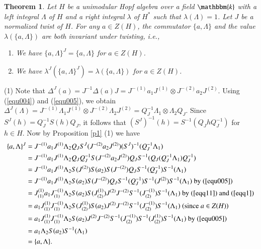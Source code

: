 \documentclass[11pt]{amsart}
\newtheorem{thm}{Theorem}[section]
\numberwithin{equation}{section}
\begin{document}
\begin{thm}\label{t1}
Let $H$ be a unimodular Hopf algebra over a field $\mathbbm{k}$ with a left integral $\Lambda$ of $H$ and a right integral $\lambda$ of $H^*$ such that $\lambda(\Lambda)=1$. Let $J$ be a normalized twist of $H$. For any $a\in Z(H)$, the commutator $\{a,\Lambda\}$ and the value $\lambda(\{a,\Lambda\})$ are both invariant under twisting, i.e.,
\begin{enumerate}
  \item We have $\{a,\Lambda\}^J=\{a,\Lambda\}$ for $a\in Z(H)$.  
  \item We have $\lambda^J(\{a,\Lambda\}^J)=\lambda(\{a,\Lambda\})$ for $a\in Z(H)$.  
\end{enumerate}
\end{thm}
\proof (1) Note that $\Delta^J(a)=J^{-1}\Delta(a)J=J^{-(1)}a_1J^{(1)}\otimes J^{-(2)}a_2J^{(2)}$. Using (\ref{equ004}) and (\ref{equ005}), we obtain  $\Delta^J(\Lambda)=J^{-(1)}\Lambda_1J^{(1)}\otimes J^{-(2)}\Lambda_2J^{(2)}=Q_J^{-1}\Lambda_1\otimes\Lambda_2Q_J$. Since $S^J(h)=Q_J^{-1}S(h)Q_J$, it follows that $(S^J)^{-1}(h)=S^{-1}(Q_JhQ_J^{-1})$ for $h\in H$. Now by Proposition \ref{p1} (1) we have 
\begin{align*}
\{a,\Lambda\}^J&=J^{-(1)}a_1J^{(1)}\Lambda_2Q_JS^J(J^{-(2)}a_2J^{(2)})(S^J)^{-1}(Q_J^{-1}\Lambda_1)\\
&=J^{-(1)}a_1J^{(1)}\Lambda_2Q_JQ_J^{-1}S(J^{-(2)}a_2J^{(2)})Q_JS^{-1}(Q_J(Q_J^{-1}\Lambda_1)Q_J^{-1})\\
&=J^{-(1)}a_1J^{(1)}\Lambda_2S(J^{(2)})S(a_2)S(J^{-(2)})Q_JS^{-1}(Q_J^{-1})S^{-1}(\Lambda_1)\\
&=J^{-(1)}a_1J^{(1)}\Lambda_2S(a_2)S(J^{-(2)})Q_JS^{-1}(Q_J^{-1})S^{-1}(J^{(2)})S^{-1}(\Lambda_1)\ \text{by}\ (\ref{equ005})\\
&=J^{(1)}_{(1)}a_1J^{-(1)}_{(1)}\Lambda_2S(a_2)S(J^{(1)}_{(2)})J^{(2)}J^{-(2)}S^{-1}(J^{-(1)}_{(2)})S^{-1}(\Lambda_1)\ \text{by}\ (\ref{eqq11})\ \text{and}\  (\ref{eqq1})\\
&=a_1J^{(1)}_{(1)}J^{-(1)}_{(1)}\Lambda_2S(J^{(1)}_{(2)})S(a_2)J^{(2)}J^{-(2)}S^{-1}(J^{-(1)}_{(2)})S^{-1}(\Lambda_1)\ (\text{since}\ a\in Z(H))\\
&=a_1J^{(1)}_{(1)}J^{-(1)}_{(1)}\Lambda_2S(a_2)J^{(2)}J^{-(2)}S^{-1}(J^{-(1)}_{(2)})S^{-1}(J^{(1)}_{(2)})S^{-1}(\Lambda_1)\ \text{by}\ (\ref{equ005})\\
&=a_1\Lambda_2S(a_2)S^{-1}(\Lambda_1)\\
&=\{a,\Lambda\}.
\end{align*}
\end{document}
